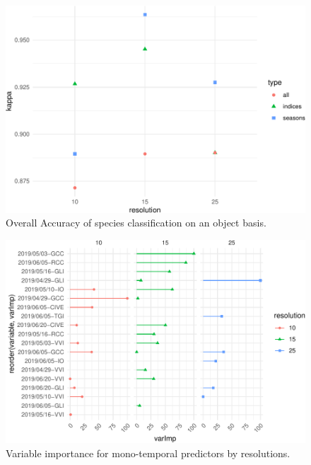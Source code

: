 \documentclass[]{article}
\begin{document}
\begin{figure}[H]

{\centering \includegraphics[width=0.6\linewidth]{report_files/figure-latex/validation_plots-1} 

}

\caption{Overall Accuracy of species classification on an object basis.}\label{fig:validation_plots}
\end{figure}

\begin{figure}[H]

{\centering \includegraphics{report_files/figure-latex/var_imp_indices-1} 

}

\caption{Variable importance for mono-temporal predictors by resolutions.}\label{fig:var_imp_indices}
\end{figure}
\end{document}
